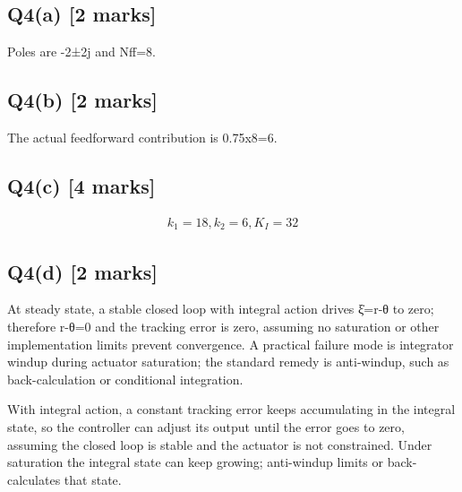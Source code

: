 \documentclass[11pt,a4paper]{article}
\begin{document}
\subsection*{Q4(a) \hfill [2 marks]}

Poles are -2±2j and Nff=8.

\subsection*{Q4(b) \hfill [2 marks]}

The actual feedforward contribution is 0.75x8=6.

\subsection*{Q4(c) \hfill [4 marks]}

\[\begin{aligned}k_1=18, k_2=6, K_I=32\end{aligned}\]

\subsection*{Q4(d) \hfill [2 marks]}

At steady state, a stable closed loop with integral action drives ξ̇=r-θ to zero; therefore r-θ=0 and the tracking error is zero, assuming no saturation or other implementation limits prevent convergence.
A practical failure mode is integrator windup during actuator saturation; the standard remedy is anti-windup, such as back-calculation or conditional integration.\par\smallskip With integral action, a constant tracking error keeps accumulating in the integral state, so the controller can adjust its output until the error goes to zero, assuming the closed loop is stable and the actuator is not constrained. Under saturation the integral state can keep growing; anti-windup limits or back-calculates that state.
\end{document}
